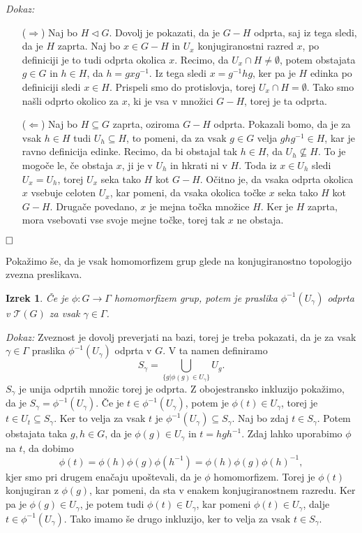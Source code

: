 \documentclass[a4paper,12pt]{article}
\def\qed{$\hfill\Box$}   %
\newtheorem{izrek}{Izrek}
\begin{document}
\noindent
{\em Dokaz:\/}
    \begin{itemize}
        \item[($\Rightarrow$)] Naj bo $H \triangleleft G$. Dovolj je pokazati, da je $G - H$ odprta, saj iz tega sledi, da je $H$ zaprta.
        Naj bo $x \in G - H$ in $U_x$ konjugiranostni razred $x$, po definiciji je to tudi odprta okolica $x$.
        Recimo, da $U_x \cap H \neq \emptyset$, potem obstajata $g \in G$ in $h \in H$, da $h = gxg^{-1}$.
        Iz tega sledi $x = g^{-1}hg$, ker pa je $H$ edinka po definiciji sledi $x \in H$. Prispeli smo do protislovja, torej $U_x \cap H = \emptyset$.
        Tako smo našli odprto okolico za $x$, ki je vsa v množici $G - H$, torej je ta odprta.
        \item[($\Leftarrow$)] Naj bo $H \subseteq G$ zaprta, oziroma $G - H$ odprta. Pokazali bomo, da je za vsak $h \in H$ tudi
        $U_h \subseteq H$, to pomeni, da za vsak $g \in G$ velja $ghg^{-1} \in H$, kar je ravno definicija edinke. Recimo, da bi obstajal tak $h \in H$,
        da $U_h \nsubseteq H$. To je mogoče le, če obstaja $x$, ji je v $U_h$ in hkrati ni v $H$. Toda iz $x \in U_h$ sledi $U_x = U_h$, torej $U_x$ seka tako $H$ kot $G - H$.
        Očitno je, da vsaka odprta okolica $x$ vsebuje celoten $U_x$, kar pomeni, da vsaka okolica točke $x$ seka tako $H$ kot $G - H$. Drugače povedano, $x$ je mejna točka množice $H$.
        Ker je $H$ zaprta, mora vsebovati vse svoje mejne točke, torej tak $x$ ne obstaja.
    \end{itemize} 
\qed

Pokažimo še, da je vsak homomorfizem grup glede na konjugiranostno topologijo zvezna preslikava.

\begin{izrek}
    Če je $\phi: G \rightarrow \Gamma$ homomorfizem grup, potem je praslika $\phi^{-1}(U_\gamma)$ odprta v $\mathcal{T}(G)$ za vsak $\gamma \in \Gamma$.
\end{izrek}

\noindent
{\em Dokaz:\/}
    Zveznost je dovolj preverjati na bazi, torej je treba pokazati, da je za vsak $\gamma \in \Gamma$ praslika $\phi^{-1}(U_\gamma)$ odprta v $G$.
    V ta namen definiramo
    \[ S_\gamma = \bigcup_{\{g | \phi(g) \in U_\gamma\}} U_g .\]
    $S_\gamma$ je unija odprtih množic torej je odprta. Z obojestransko inkluzijo pokažimo, da je $S_\gamma = \phi^{-1}(U_\gamma)$.
    Če je $t \in \phi^{-1}(U_\gamma)$, potem je $\phi(t) \in U_\gamma$, torej je $t \in U_t \subseteq S_\gamma$. Ker to velja za vsak $t$ je $\phi^{-1}(U_\gamma) \subseteq S_\gamma$.
    Naj bo zdaj $t \in S_\gamma$. Potem obstajata taka $g,h \in G$, da je $\phi(g) \in U_\gamma$ in $t = hgh^{-1}$. Zdaj lahko uporabimo $\phi$ na $t$, da dobimo
    \[\phi(t) = \phi(h)\phi(g)\phi(h^{-1}) = \phi(h)\phi(g)\phi(h)^{-1} ,\] kjer smo pri drugem enačaju upoštevali, da je $\phi$ homomorfizem.
    Torej je $\phi(t)$ konjugiran z $\phi(g)$, kar pomeni, da sta v enakem konjugiranostnem razredu. Ker pa je $\phi(g) \in U_\gamma$, je potem tudi $\phi(t) \in U_\gamma$,
    kar pomeni $\phi(t) \in U_\gamma$, dalje $t \in \phi^{-1}(U_\gamma)$. Tako imamo še drugo inkluzijo, ker to velja za vsak $t \in S_\gamma$.
\end{document}
